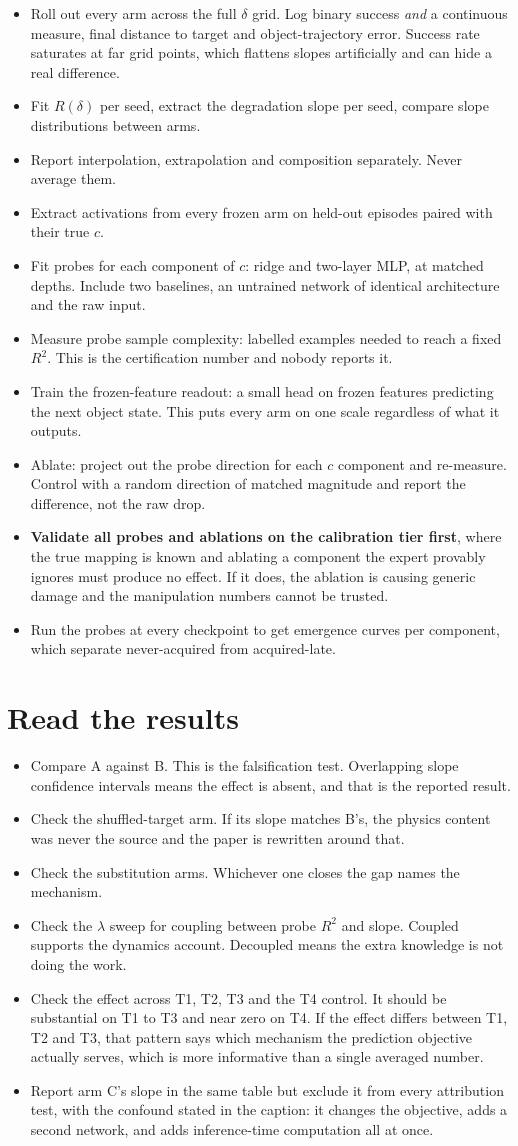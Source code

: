 \documentclass[9pt]{extarticle}
\newcommand{\ck}{\item[$\square$]}
\begin{document}
\begin{itemize}
\ck Roll out every arm across the full $\delta$ grid. Log binary success \emph{and} a continuous measure, final distance to target and object-trajectory error. Success rate saturates at far grid points, which flattens slopes artificially and can hide a real difference.
\ck Fit $R(\delta)$ per seed, extract the degradation slope per seed, compare slope distributions between arms.
\ck Report interpolation, extrapolation and composition separately. Never average them.
\ck Extract activations from every frozen arm on held-out episodes paired with their true $c$.
\ck Fit probes for each component of $c$: ridge and two-layer MLP, at matched depths. Include two baselines, an untrained network of identical architecture and the raw input.
\ck Measure probe sample complexity: labelled examples needed to reach a fixed $R^2$. This is the certification number and nobody reports it.
\ck Train the frozen-feature readout: a small head on frozen features predicting the next object state. This puts every arm on one scale regardless of what it outputs.
\ck Ablate: project out the probe direction for each $c$ component and re-measure. Control with a random direction of matched magnitude and report the difference, not the raw drop.
\ck \textbf{Validate all probes and ablations on the calibration tier first}, where the true mapping is known and ablating a component the expert provably ignores must produce no effect. If it does, the ablation is causing generic damage and the manipulation numbers cannot be trusted.
\ck Run the probes at every checkpoint to get emergence curves per component, which separate never-acquired from acquired-late.
\end{itemize}

\section{Read the results}

\begin{itemize}
\ck Compare A against B. This is the falsification test. Overlapping slope confidence intervals means the effect is absent, and that is the reported result.
\ck Check the shuffled-target arm. If its slope matches B's, the physics content was never the source and the paper is rewritten around that.
\ck Check the substitution arms. Whichever one closes the gap names the mechanism.
\ck Check the $\lambda$ sweep for coupling between probe $R^2$ and slope. Coupled supports the dynamics account. Decoupled means the extra knowledge is not doing the work.
\ck Check the effect across T1, T2, T3 and the T4 control. It should be substantial on T1 to T3 and near zero on T4. If the effect differs between T1, T2 and T3, that pattern says which mechanism the prediction objective actually serves, which is more informative than a single averaged number.
\ck Report arm C's slope in the same table but exclude it from every attribution test, with the confound stated in the caption: it changes the objective, adds a second network, and adds inference-time computation all at once.
\end{itemize}
\end{document}
